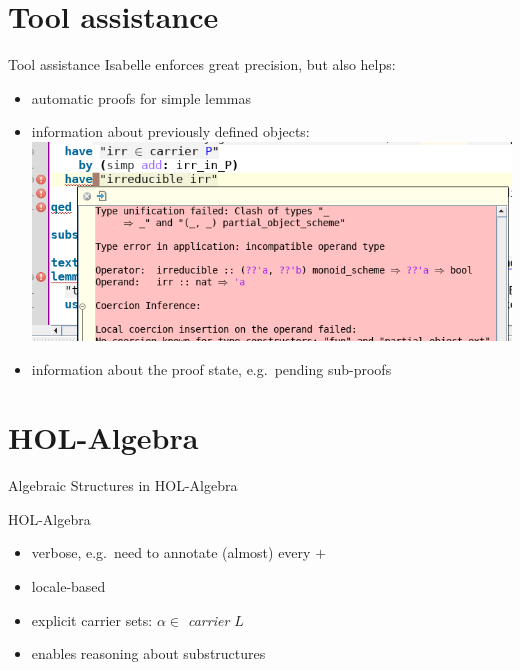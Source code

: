 \documentclass[%
	sans,
	12pt,
]{beamer}
\newcommand{\high}[1]{{\usebeamercolor[fg]{structure} #1}}
\begin{document}
\section{Tool assistance}
\begin{frame}{Tool assistance}%
Isabelle enforces great precision, but also helps:
\begin{itemize}
	\item automatic proofs for simple lemmas\pause %
	\item information about previously defined objects: \pause
	\includegraphics[width=0.7\linewidth]{"type_error"} \pause
	\item information about the proof state, e.g.\ pending sub-proofs
\end{itemize}
\end{frame}

\section{HOL-Algebra}
\begin{frame}
\begin{center}
\huge\high{Algebraic Structures in HOL-Algebra}%
\end{center}
\end{frame}

\begin{frame}{HOL-Algebra}
\begin{itemize}
	\item verbose, e.g.\ need to annotate (almost) every $+$ \pause %
	\item locale-based \pause
	\item explicit carrier sets: \textit{$\alpha \in$ carrier $L$} \pause
	\item enables reasoning about substructures	%
\end{itemize}
\end{frame}
\end{document}
